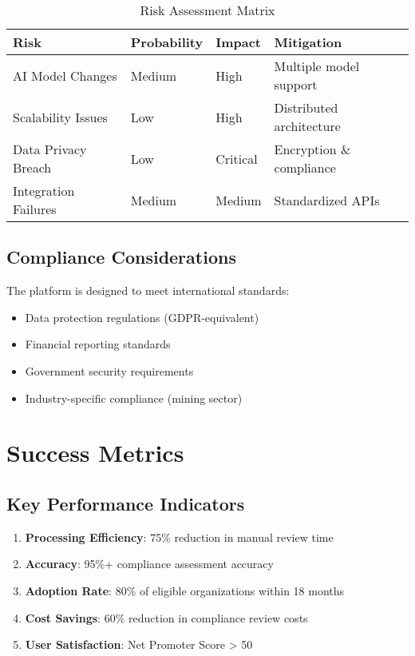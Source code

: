 \documentclass[11pt,a4paper]{article}
\begin{document}
\begin{table}[H]
\centering
\footnotesize
\begin{tabular}{p{3cm}p{2cm}p{4cm}p{3cm}}
\toprule
\textbf{Risk} & \textbf{Probability} & \textbf{Impact} & \textbf{Mitigation} \\
\midrule
AI Model Changes & Medium & High & Multiple model support \\
Scalability Issues & Low & High & Distributed architecture \\
Data Privacy Breach & Low & Critical & Encryption \& compliance \\
Integration Failures & Medium & Medium & Standardized APIs \\
\bottomrule
\end{tabular}
\caption{Risk Assessment Matrix}
\end{table}

\subsection{Compliance Considerations}

\begin{keypoint}
The platform is designed to meet international standards:
\begin{itemize}
    \item Data protection regulations (GDPR-equivalent)
    \item Financial reporting standards
    \item Government security requirements
    \item Industry-specific compliance (mining sector)
\end{itemize}
\end{keypoint}

\section{Success Metrics}

\subsection{Key Performance Indicators}

\begin{enumerate}
    \item \textbf{Processing Efficiency}: 75\% reduction in manual review time
    \item \textbf{Accuracy}: 95\%+ compliance assessment accuracy
    \item \textbf{Adoption Rate}: 80\% of eligible organizations within 18 months
    \item \textbf{Cost Savings}: 60\% reduction in compliance review costs
    \item \textbf{User Satisfaction}: Net Promoter Score > 50
\end{enumerate}
\end{document}
